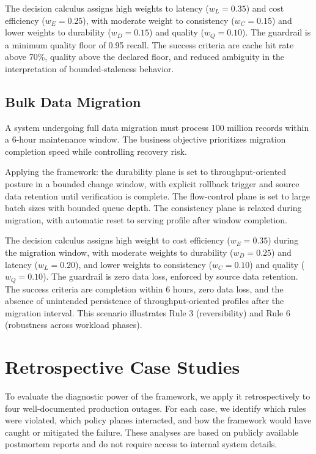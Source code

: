 \documentclass[conference]{IEEEtran}
\begin{document}
The decision calculus assigns high weights to latency ($w_L = 0.35$) and cost efficiency ($w_E = 0.25$), with moderate weight to consistency ($w_C = 0.15$) and lower weights to durability ($w_D = 0.15$) and quality ($w_Q = 0.10$). The guardrail is a minimum quality floor of 0.95 recall. The success criteria are cache hit rate above 70\%, quality above the declared floor, and reduced ambiguity in the interpretation of bounded-staleness behavior.

\subsection{Bulk Data Migration}

A system undergoing full data migration must process 100 million records within a 6-hour maintenance window. The business objective prioritizes migration completion speed while controlling recovery risk.

Applying the framework: the durability plane is set to throughput-oriented posture in a bounded change window, with explicit rollback trigger and source data retention until verification is complete. The flow-control plane is set to large batch sizes with bounded queue depth. The consistency plane is relaxed during migration, with automatic reset to serving profile after window completion.

The decision calculus assigns high weight to cost efficiency ($w_E = 0.35$) during the migration window, with moderate weights to durability ($w_D = 0.25$) and latency ($w_L = 0.20$), and lower weights to consistency ($w_C = 0.10$) and quality ($w_Q = 0.10$). The guardrail is zero data loss, enforced by source data retention. The success criteria are completion within 6 hours, zero data loss, and the absence of unintended persistence of throughput-oriented profiles after the migration interval. This scenario illustrates Rule 3 (reversibility) and Rule 6 (robustness across workload phases).

\section{Retrospective Case Studies}

To evaluate the diagnostic power of the framework, we apply it retrospectively to four well-documented production outages. For each case, we identify which rules were violated, which policy planes interacted, and how the framework would have caught or mitigated the failure. These analyses are based on publicly available postmortem reports and do not require access to internal system details.
\end{document}

